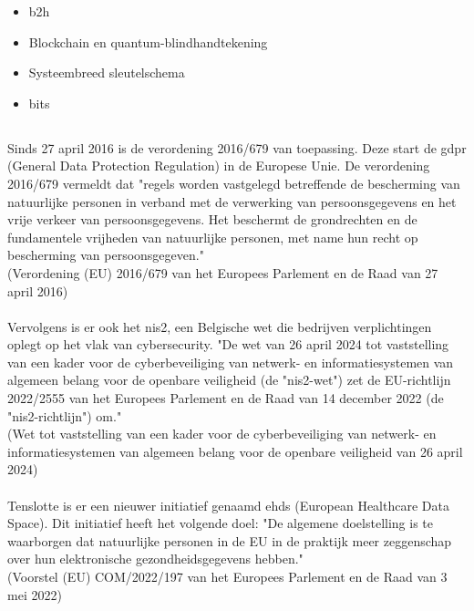 \begin{itemize}
  \item \gls{b2h} \autocite{Ghosh2022}
  \item Blockchain en quantum-blindhandtekening \autocite{Bhavin2021}
  \item Systeembreed sleutelschema \autocite{Chang2022}
  \item \gls{bits} \autocite{Gupta2020}
\end{itemize}
\subsection{}%
\label{sec:wet}%

Sinds 27 april 2016 is de verordening 2016/679 van toepassing. Deze start de \gls{gdpr} (General Data Protection Regulation) in de Europese Unie. De verordening 2016/679 vermeldt dat "regels worden vastgelegd betreffende de bescherming van natuurlijke personen in verband met de verwerking van persoonsgegevens en het vrije verkeer van persoonsgegevens. Het beschermt de grondrechten en de fundamentele vrijheden van natuurlijke personen, met name hun recht op bescherming van persoonsgegeven."\\ (Verordening (EU) 2016/679 van het Europees Parlement en de Raad van 27 april 2016) %
\\\\
Vervolgens is er ook het \gls{nis2}, een Belgische wet die bedrijven verplichtingen oplegt op het vlak van cybersecurity. "De wet van 26 april 2024 tot vaststelling van een kader voor de cyberbeveiliging van netwerk- en informatiesystemen van algemeen belang voor de openbare veiligheid (de "\gls{nis2}-wet") zet de EU-richtlijn 2022/2555 van het Europees Parlement en de Raad van 14 december 2022 (de "\gls{nis2}-richtlijn") om." \\
(Wet tot vaststelling van een kader voor de cyberbeveiliging van netwerk- en informatiesystemen van algemeen belang voor de openbare veiligheid van 26 april 2024) %
\\\\
Tenslotte is er een nieuwer initiatief genaamd \gls{ehds} (European Healthcare Data Space). Dit initiatief heeft het volgende doel: "De algemene doelstelling is te waarborgen dat natuurlijke personen in de EU in de praktijk meer zeggenschap over hun elektronische gezondheidsgegevens hebben."\\ (Voorstel (EU) COM/2022/197 van het Europees Parlement en de Raad van 3 mei 2022) %

